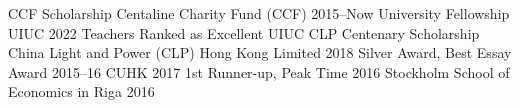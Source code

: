 
\begin{cvhonors}
  \cvhonor
    {CCF Scholarship} %
    {Centaline Charity Fund (CCF)} %
    {} %
    {2015--Now} %
  \cvhonor
    {University Fellowship} %
    {UIUC} %
    {} %
    {2022} %
  \cvhonor
    {Teachers Ranked as Excellent} %
    {UIUC} %
    {} %
    {} %
  \cvhonor
    {CLP Centenary Scholarship} %
    {China Light and Power (CLP) Hong Kong Limited} %
    {} %
    {2018} %
  \cvhonor
    {Silver Award, Best Essay Award 2015--16} %
    {CUHK} %
    {} %
    {2017} %
  \cvhonor
    {1st Runner-up, Peak Time 2016} %
    {Stockholm School of Economics in Riga} %
    {} %
    {2016} %
\end{cvhonors}
